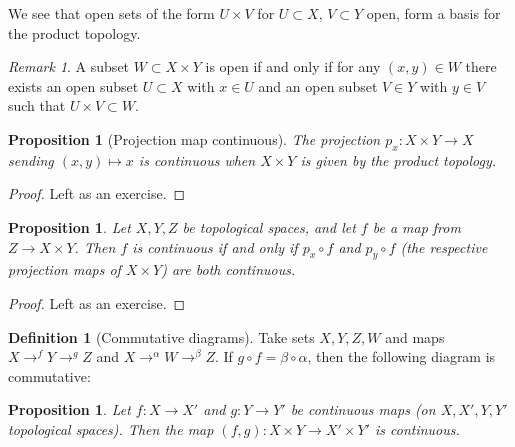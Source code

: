 \documentclass{article}
\theoremstyle{definition}
\newtheorem{defn}{Definition}[section]
\theoremstyle{plain}%
\newtheorem{prop}[thm]{Proposition}
\theoremstyle{remark}
\newtheorem*{rem}{Remark}
\newcommand{\cross}{\times}
\begin{document}
We see that open sets of the form $U \cross V$ for $U \subset X$, $V \subset Y$ open, form a basis for the product topology.

\begin{rem}
    A subset $W \subset X \cross Y$ is open if and only if for any $(x, y) \in W$ there exists an open subset $U \subset X$ with $x \in U$ and an open subset $V \in Y$ with $y \in V$ such that $U \cross V \subset W$. 
\end{rem}

\begin{prop}[Projection map continuous]
    The projection $p_x : X \times Y \to X$ sending $(x,y) \mapsto x$ is continuous when $X \times Y$ is given by the product topology.
\end{prop}

\begin{proof}
    Left as an exercise.
\end{proof}

\begin{prop}\label{func cont. if proj continuous prop}
    Let $X,Y,Z$ be topological spaces, and let $f$ be a map from $Z \to X \times Y$. Then $f$ is continuous if and only if $p_x \circ f$ and $p_y \circ f$ (the respective projection maps of $X \times Y$) are both continuous.
\end{prop}

\begin{proof}
    Left as an exercise.
\end{proof}

\begin{defn}[Commutative diagrams]
    Take sets $X,Y,Z,W$ and maps $X \to^f Y \to^g Z$ and $X \to^\alpha W \to^\beta Z$. If $g \circ f = \beta \circ \alpha$, then the following diagram is commutative:
\end{defn}

\begin{prop}
    Let $f : X \to X'$ and $g : Y \to Y'$ be continuous maps (on $X,X',Y,Y'$ topological spaces). Then the map $(f,g) : X \times Y \to X' \times Y'$ is continuous.
\end{prop}
\end{document}
